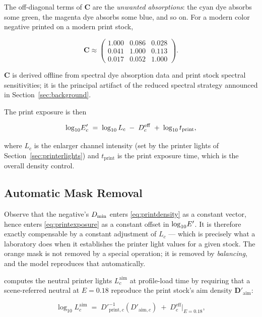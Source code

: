 The off-diagonal terms of $\mathbf{C}$ are the \emph{unwanted absorptions}: the
cyan dye absorbs some green, the magenta dye absorbs some blue, and so on. For a
modern color negative printed on a modern print stock,

\begin{equation}
\mathbf{C} \approx
\begin{pmatrix}
1.000 & 0.086 & 0.028 \\
0.041 & 1.000 & 0.113 \\
0.017 & 0.052 & 1.000
\end{pmatrix}.
\label{eq:cmatrix}
\end{equation}

$\mathbf{C}$ is derived offline from spectral dye absorption data
\cite{kodak2383,james1977} and print
stock spectral sensitivities; it is the principal artifact of the reduced
spectral strategy announced in Section~\ref{sec:background}.

The print exposure is then

\begin{equation}
\log_{10}\!E'_c \;=\; \log_{10} L_c \;-\; D^{\mathrm{eff}}_c \;+\; \log_{10} t_{\mathrm{print}},
\label{eq:printexposure}
\end{equation}

where $L_c$ is the enlarger channel intensity (set by the printer lights of
Section~\ref{sec:printerlights}) and $t_{\mathrm{print}}$ is the print exposure
time, which is the overall density control.

\subsection{Automatic Mask Removal}

Observe that the negative's $D_{\min}$ enters \eqref{eq:printdensity} as a constant
vector, hence enters \eqref{eq:printexposure} as a constant offset in
$\log_{10}\!E'$. It is therefore exactly compensable by a constant adjustment of $L_c$
--- which is precisely what a laboratory does when it establishes the printer
light values for a given stock. The orange mask is not removed by a special
operation; it is removed by \emph{balancing}, and the model reproduces that
automatically.

\EM{} computes the neutral printer lights $L_c^{\mathrm{aim}}$ at profile-load
time by requiring that a scene-referred neutral at $E = 0.18$ reproduce the
print stock's aim density $\mathbf{D}'_{\mathrm{aim}}$:

\begin{equation}
\log_{10} L_c^{\mathrm{aim}} \;=\; D'^{-1}_{\mathrm{print},c}\!\left(D'_{\mathrm{aim},c}\right) \;+\; D^{\mathrm{eff}}_c\big|_{E=0.18},
\label{eq:aimbalance}
\end{equation}

